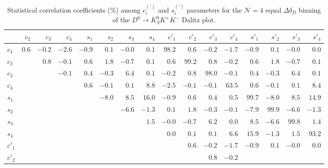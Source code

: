 \documentclass[aps,prd,superscriptaddress,nopreprintnumbers,nofootinbib,showpacs,floatfix]{revtex4}
\begin{document}
\begin{table}[htb]
\caption{Statistical correlation coefficients (\%) among $c^{(\prime)}_{i}$ and $s^{(\prime)}_{i}$ parameters for %
the $\mathcal{N}=4$ equal $\Delta\delta_D$ binning of the $D^{0}\to K^{0}_{S}K^{+}K^{-}$ Dalitz %
plot.}\label{tab:corr_K0SKK_4bin_stat}
\begin{center} 
\begin{tabular}{lrrrrrrrrrrrrrrr} \hline\hline
      & $c_2 $ & $c_3$ & $c_4$ & $s_1$ & $s_2$ & $s_3$ & $s_4$ & $c'_1$ & $c'_2$ & $c'_3$ & $c'_4$ & $s'_1$ & %
$s'_2$ & $s'_3$ & $s'_4$ \\ \hline 
$c_1$ &$  0.6 $ &$ -0.2 $ &$ -2.6 $ &$ -0.9 $ &$  0.1 $ &$  -0.0 $&$  0.1 $ &$  98.2 $&$  0.6 $ &$ -0.2 $ &$ -1.7 $ %
&$ -0.9 $ &$  0.1 $ &$  -0.0 $&$  0.0 $ \\ 
$c_2$ &         &$  0.8 $ &$ -0.1 $ &$  0.6 $ &$  1.8 $ &$ -0.7 $ &$  0.1 $ &$  0.6 $ &$  99.2 $&$  0.8 $ &$ -0.2 $ %
&$  0.6 $ &$  1.8 $ &$ -0.7 $ &$  0.1 $ \\ 
$c_3$ &         &         &$ -0.1 $ &$  0.4 $ &$ -0.3 $ &$  6.4 $ &$  0.1 $ &$ -0.2 $ &$  0.8 $ &$  98.0 $&$ -0.1 $ %
&$  0.4 $ &$ -0.3 $ &$  6.4 $ &$  0.1 $ \\ 
$c_4$ &         &         &         &$  0.6 $ &$ -0.1 $ &$  0.1 $ &$  8.8 $ &$ -2.5 $ &$ -0.1 $ &$ -0.1 $ &$  63.5 %
$&$  0.6 $ &$ -0.1 $ &$  0.1 $ &$  8.4 $ \\ 
$s_1$ &         &         &         &         &$ -8.0 $ &$  8.5 $ &$  16.0 $&$ -0.9 $ &$  0.6 $ &$  0.4 $ &$  0.5 $ %
&$  99.7 $&$ -8.0 $ &$  8.5 $ &$  14.9 $ \\
$s_2$ &         &         &         &         &         &$ -6.6 $ &$ -1.3 $ &$  0.1 $ &$  1.8 $ &$ -0.3 $ &$ -0.1 $ %
&$ -7.9 $ &$  99.9 $&$ -6.6 $ &$ -1.3 $ \\ 
$s_3$ &         &         &         &         &         &         &$  1.5 $ &$  -0.0 $&$ -0.7 $ &$  6.2 $ &$  0.0 $ %
&$  8.5 $ &$ -6.6 $ &$  99.8 $&$  1.4 $ \\ 
$s_4$ &         &         &         &         &         &         &         &$  0.0 $ &$  0.1 $ &$  0.1 $ &$  6.6 $ %
&$  15.9 $&$ -1.3 $ &$  1.5 $ &$  93.2 $ \\
$c'_1$&         &         &         &         &         &         &         &         &$  0.6 $ &$ -0.2 $ &$ -1.7 $ %
&$ -0.9 $ &$  0.1 $ &$  -0.0 $&$  0.0 $ \\ 
$c'_2$&         &         &         &         &         &         &         &         &         &$  0.8 $ &$ -0.2 $ %

\end{tabular}
\end{center}
\end{table}
\end{document}

